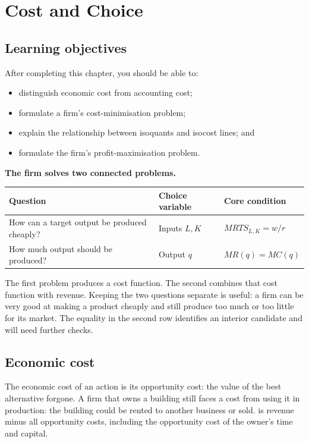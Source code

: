 \chapter{Cost and Choice}
\label{chap:cost-choice}

\section{Learning objectives}

After completing this chapter, you should be able to:
\begin{itemize}
  \item distinguish economic cost from accounting cost;
  \item formulate a firm's cost-minimisation problem;
  \item explain the relationship between isoquants and isocost lines; and
  \item formulate the firm's profit-maximisation problem.
\end{itemize}

\begin{keyidea}
\textbf{The firm solves two connected problems.}
\begin{center}
\begin{tabular}{lll}
\toprule
Question & Choice variable & Core condition \\
\midrule
How can a target output be produced cheaply? & Inputs $L,K$ & $MRTS_{L,K}=w/r$ \\
How much output should be produced? & Output $q$ & $MR(q)=MC(q)$ \\
\bottomrule
\end{tabular}
\end{center}
The first problem produces a cost function. The second combines that cost
function with revenue. Keeping the two questions separate is useful: a firm
can be very good at making a product cheaply and still produce too much or too
little for its market. The equality in the second row identifies an interior
candidate and will need further checks.
\end{keyidea}

\section{Economic cost}

The economic cost of an action is its opportunity cost: the value of the best
alternative forgone. A firm that owns a building still faces a cost from using
it in production: the building could be rented to another business or sold.
 is revenue minus all opportunity costs, including
the opportunity cost of the owner's time and capital.

